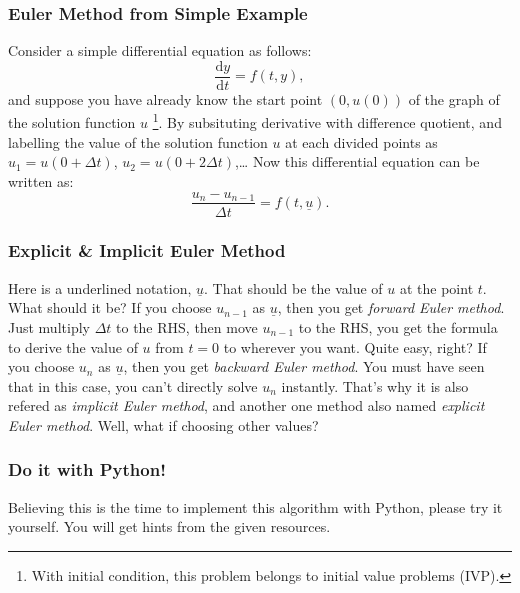 \documentclass[compress,xcolor={dvipsnames}]{beamer}
\begin{document}
\begin{frame}
    \frametitle{Euler Method from Simple Example}
    Consider a simple differential equation as follows:
    \[\frac{\mathrm{d} y}{\mathrm{d} t} = f(t,y),\]
    and suppose you have already know the start point \(\left( 0, u(0) \right)\) of the graph of the solution function \(u\)
    \footnote{With initial condition, this problem belongs to initial value problems (IVP).}.
    By subsituting derivative with difference quotient, and labelling the value of the solution function
    \(u\) at each divided points as \(u_1 = u(0+\Delta t)\), \(u_2 = u(0+2\Delta t)\),\dots
    \bigbreak
    \pause
    Now this differential equation can be written as:
    \[\frac{u_n - u_{n-1}}{\Delta t} = f(t,\underline{u}).\]
\end{frame}

\begin{frame}
    \frametitle{Explicit \& Implicit Euler Method}
    Here is a underlined notation, \(\underline{u}\). That should be the value of \(u\) at the point \(t\). What should it be?
    \bigbreak
    \pause
    If you choose \(u_{n-1}\) as  \(\underline{u}\), then you get \emph{forward Euler method}. Just multiply \(\Delta t\) to the RHS,
    then move \(u_{n-1}\) to the RHS, you get the formula to derive the value of \(u\) from \(t = 0\) to wherever you want. Quite easy, right?
    \bigbreak
    \pause
    If you choose \(u_n\) as \(\underline{u}\), then you get \emph{backward Euler method}. You must have seen that in this case, you can't
    directly solve \(u_n\) instantly. That's why it is also refered as \emph{implicit Euler method}, and another one method also named
    \emph{explicit Euler method}.
    \pause
    \bigbreak
    Well, what if choosing other values?
\end{frame}

\begin{frame}
    \frametitle{Do it with Python!}
    Believing this is the time to implement this algorithm with Python, please try it yourself.
    \bigbreak
    You will get hints from the given resources.
\end{frame}
\end{document}
